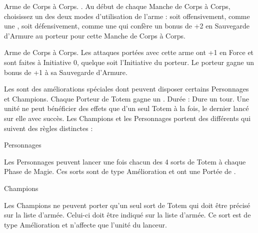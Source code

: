 \closearmyspecialrules




\newpage
\startarmyarmoury

\startitemlistonecol

\listitemonecol{\soothsayerstaff}Arme de Corps à Corps. \requirestwohands{}. Au début de chaque Manche de Corps à Corps, choisissez un des deux modes d'utilisation de l'arme : soit offensivement, comme une \gw{}, soit défensivement, comme une \hw{} qui confère un bonus de +2 en Sauvegarde d'Armure au porteur pour cette Manche de Corps à Corps.

\listitemonecol{\beastaxe}Arme de Corps à Corps. Les attaques portées avec cette arme ont +1 en Force et sont faites à Initiative 0, quelque soit l'Initiative du porteur. Le porteur gagne un bonus de +1 à sa Sauvegarde d'Armure.

\enditemlistonecol

\closearmyarmoury





\startarmynewsectionSP{\totems}

\spaceaftersection{}

Les \totems{} sont des améliorations spéciales dont peuvent disposer certains Personnages et Champions. Chaque Porteur de Totem gagne un . Durée : Dure un tour. Une unité ne peut bénéficier des effets que d'un seul Totem à la fois, le dernier lancé sur elle avec succès. Les Champions et les Personnages portent des \totems{} différents qui suivent des règles distinctes :

\begin{multicols}{2}
\raggedcolumns

	\begin{center}{\Largerfontsize\antiquefont Personnages}\end{center}
	\vspace{5pt}
	Les Personnages peuvent lancer une fois chacun des 4 sorts de Totem à chaque Phase de Magie. Ces sorts sont de type Amélioration et ont une Portée de .

	\vspace*{\fill}
	\columnbreak
	
	\begin{center}{\Largerfontsize\antiquefont Champions}\end{center}
	\vspace{5pt}
	Les Champions ne peuvent porter qu'un seul sort de Totem qui doit être précisé sur la liste d'armée. Celui-ci doit être indiqué sur la liste d'armée. Ce sort est de type Amélioration et n'affecte que l'unité du lanceur.

	\vspace*{\fill}
\end{multicols}

